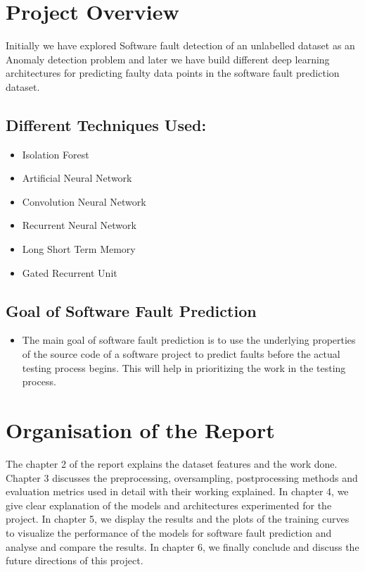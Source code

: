 \section{Project Overview}
Initially we have explored Software fault detection of an unlabelled dataset as an Anomaly detection problem and later we have build different deep learning architectures for predicting faulty data points in the software fault prediction dataset.

\subsection{Different Techniques Used: }
\begin{itemize}
  \item Isolation Forest
  \item Artificial Neural Network
  \item Convolution Neural Network
  \item Recurrent Neural Network
  \item Long Short Term Memory 
  \item Gated Recurrent Unit
\end{itemize}

\subsection{Goal of Software Fault Prediction}
\begin{itemize}
  \item The main goal of software fault prediction is to use the underlying properties of the source code of a software project to predict faults before the actual testing process begins. This will help in prioritizing the work in the testing process.
\end{itemize}

\section{Organisation of the Report}\label{sec1.3}
The chapter 2 of the report explains the dataset features and the work done. Chapter 3 discusses the preprocessing, oversampling, postprocessing methods and  evaluation metrics used in detail with their working explained. In chapter 4, we give clear explanation of the models and architectures experimented for the project. In chapter 5, we display the results and the plots of the training curves to visualize the performance of the models for software fault prediction and analyse and compare the results. In chapter 6, we finally conclude and discuss the future directions of this project.
